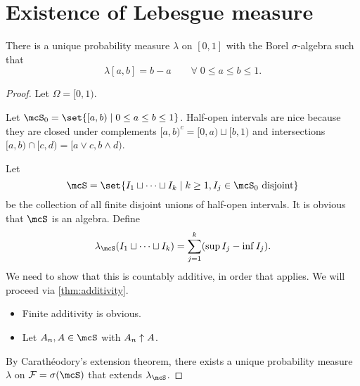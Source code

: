 \section{Existence of Lebesgue measure} \label{sec:lebesgue}
\begin{theorem*} \label{thm:lebesgue}
    There is a unique probability measure $\lambda$ on
    $[0, 1]$ with the Borel $\sigma$-algebra such that \[
        \lambda[a, b] = b - a \qquad \forall\; 0 \le a \le b \le 1.
    \]
\end{theorem*}
\begin{proof}
    Let $\Omega = [0, 1)$.

    Let $\mcS_0 = \set{[a, b) \mid 0 \le a \le b \le 1}$.
    Half-open intervals are nice because they are closed under complements
    $[a, b)^c = [0, a) \sqcup [b, 1)$ and intersections
    $[a, b) \cap [c, d) = [a \vee c, b \wedge d)$.

    Let \[
        \mcS = \set{I_1 \sqcup \cdots \sqcup I_k
                \mid k \ge 1, I_j \in \mcS_0 \text{ disjoint}}
    \] be the collection of all finite disjoint unions of
    half-open intervals.
    It is obvious that $\mcS$ is an algebra.
    Define \[
        \lambda_\mcS(I_1 \sqcup \dots \sqcup I_k)
        = \sum_{j=1}^k (\sup I_j - \inf I_j).
    \]
    We need to show that this is countably additive, in order that
     applies.
    We will proceed via \cref{thm:additivity}.
    \begin{itemize}
        \item Finite additivity is obvious.
        \item Let $A_n, A \in \mcS$ with $A_n \uparrow A$.
    \end{itemize}
    By Carathéodory's extension theorem, there exists a unique
    probability measure $\lambda$ on $\F = \sigma(\mcS)$ that extends
    $\lambda_\mcS$.
\end{proof}

